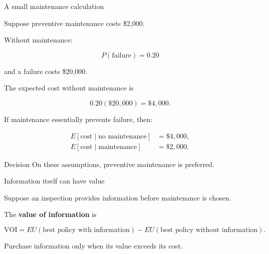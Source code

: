 \documentclass[aspectratio=43,11pt]{beamer}
\begin{document}
\begin{frame}{A small maintenance calculation}

Suppose preventive maintenance costs \$2,000.

Without maintenance:

\[
P(\text{failure})=0.20
\]

and a failure costs \$20,000.

The expected cost without maintenance is

\[
0.20(\$20{,}000)
=
\$4{,}000.
\]

If maintenance essentially prevents failure, then:

\[
\begin{aligned}
E[\text{cost}\mid\text{no maintenance}] &= \$4{,}000,\\
E[\text{cost}\mid\text{maintenance}] &= \$2{,}000.
\end{aligned}
\]

\begin{alertblock}{Decision}
On these assumptions, preventive maintenance is preferred.
\end{alertblock}

\end{frame}

\begin{frame}{Information itself can have value}

Suppose an inspection provides information before maintenance is chosen.

\begin{center}
\end{center}

The \textbf{value of information} is

\[
\mathrm{VOI}
=
EU(\text{best policy with information})
-
EU(\text{best policy without information}).
\]

Purchase information only when its value exceeds its cost.

\end{frame}
\end{document}
